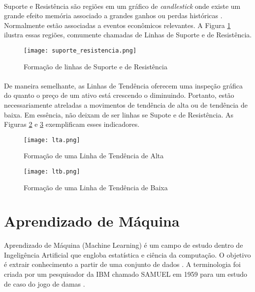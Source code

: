 \paragraph{} Suporte e Resistência são regiões em um gráfico de \textit{candlestick} onde existe um grande efeito memória associado a grandes ganhos ou perdas históricas \cite{moraes2007se}. Normalmente estão associadas a eventos econômicos relevantes. A Figura \ref{fig:3} ilustra essas regiões, comumente chamadas de Linhas de Suporte e de Resistência.

\begin{figure}[h]
    \texttt{[image: suporte\_resistencia.png]}
    \centering
    \caption{Formação de linhas de Suporte e de Resistência \cite{moraes2007se}}
    \label{fig:3}
\end{figure}

\paragraph{} De maneira semelhante, as Linhas de Tendência oferecem uma inspeção gráfica do quanto o preço de um ativo está crescendo o diminuindo. Portanto, estão necessariamente atreladas a movimentos de tendência de alta ou de tendência de baixa. Em essência, não deixam de ser linhas se Supote e de Resistência. As Figuras \ref{fig:4} e \ref{fig:5} exemplificam esses indicadores.

\begin{figure}[h]
    \texttt{[image: lta.png]}
    \centering
    \caption{Formação de uma Linha de Tendência de Alta \cite{moraes2007se}}
    \label{fig:4}
\end{figure}

\begin{figure}[h]
    \texttt{[image: ltb.png]}
    \centering
    \caption{Formação de uma Linha de Tendência de Baixa \cite{moraes2007se}}
    \label{fig:5}
\end{figure}


\section{Aprendizado de Máquina}

\paragraph{} Aprendizado de Máquina (Machine Learning) é um campo de estudo dentro de Ingeligência Artificial \cite{ibm_ai} que engloba estatística e ciência da computação. O objetivo é extrair conhecimento a partir de uma conjunto de dados \cite{muller2016introduction}. A terminologia foi criada por um pesquisador da IBM chamado SAMUEL em 1959 \cite{ibm_ml} para um estudo de caso do jogo de damas \cite{arthur1959some}.

